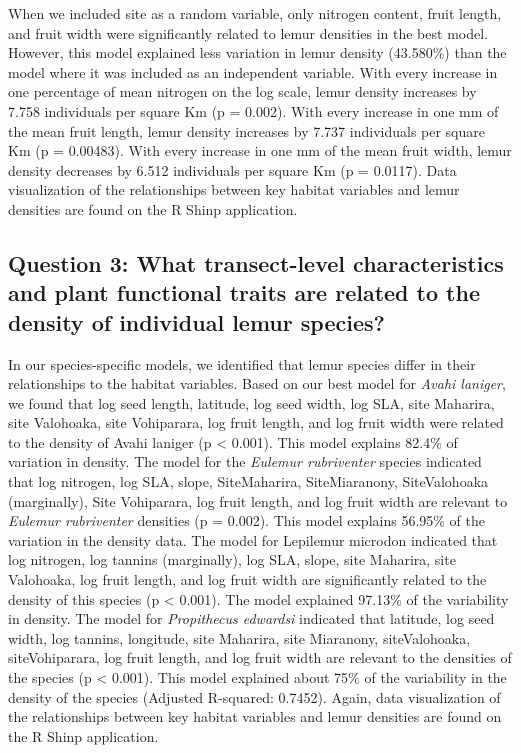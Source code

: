 \documentclass[
  12pt,
]{article}
\begin{document}
When we included site as a random variable, only nitrogen content, fruit
length, and fruit width were significantly related to lemur densities in
the best model. However, this model explained less variation in lemur
density (43.580\%) than the model where it was included as an
independent variable. With every increase in one percentage of mean
nitrogen on the log scale, lemur density increases by 7.758 individuals
per square Km (p = 0.002). With every increase in one mm of the mean
fruit length, lemur density increases by 7.737 individuals per square Km
(p = 0.00483). With every increase in one mm of the mean fruit width,
lemur density decreases by 6.512 individuals per square Km (p = 0.0117).
Data visualization of the relationships between key habitat variables
and lemur densities are found on the R Shinp application.

\hypertarget{question-3-what-transect-level-characteristics-and-plant-functional-traits-are-related-to-the-density-of-individual-lemur-species-1}{%
\subsection{Question 3: What transect-level characteristics and plant
functional traits are related to the density of individual lemur
species?}\label{question-3-what-transect-level-characteristics-and-plant-functional-traits-are-related-to-the-density-of-individual-lemur-species-1}}

In our species-specific models, we identified that lemur species differ
in their relationships to the habitat variables. Based on our best model
for \emph{Avahi laniger}, we found that log seed length, latitude, log
seed width, log SLA, site Maharira, site Valohoaka, site Vohiparara, log
fruit length, and log fruit width were related to the density of Avahi
laniger (p \textless{} 0.001). This model explains 82.4\% of variation
in density. The model for the \emph{Eulemur rubriventer} species
indicated that log nitrogen, log SLA, slope, SiteMaharira,
SiteMiaranony, SiteValohoaka (marginally), Site Vohiparara, log fruit
length, and log fruit width are relevant to \emph{Eulemur rubriventer}
densities (p = 0.002). This model explains 56.95\% of the variation in
the density data. The model for Lepilemur microdon indicated that log
nitrogen, log tannins (marginally), log SLA, slope, site Maharira, site
Valohoaka, log fruit length, and log fruit width are significantly
related to the density of this species (p \textless{} 0.001). The model
explained 97.13\% of the variability in density. The model for
\emph{Propithecus edwardsi} indicated that latitude, log seed width, log
tannins, longitude, site Maharira, site Miaranony, siteValohoaka,
siteVohiparara, log fruit length, and log fruit width are relevant to
the densities of the species (p \textless{} 0.001). This model explained
about 75\% of the variability in the density of the species (Adjusted
R-squared: 0.7452). Again, data visualization of the relationships
between key habitat variables and lemur densities are found on the R
Shinp application.
\end{document}
